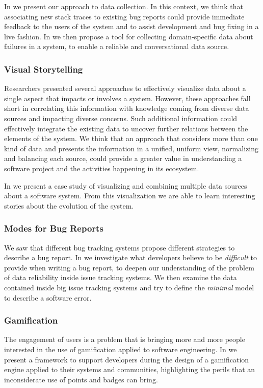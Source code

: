 In  we present our approach to data collection.
In this context, we think that associating new stack traces to existing bug reports could provide immediate feedback to the users of the system and to assist development and bug fixing in a live fashion.
In  we then propose a tool for collecting domain-specific data about failures in a system, to enable a reliable and conversational data source.


\subsubsection{Visual Storytelling}

Researchers presented several approaches to effectively visualize data about a single aspect that impacts or involves a system.
However, these approaches fall short in correlating this information with knowledge coming from diverse data sources and impacting diverse concerns.
Such additional information could effectively integrate the existing data to uncover further relations between the elements of the system.
We think that an approach that considers more than one kind of data and presents the information in a unified, uniform view, normalizing and balancing each source, could provide a greater value in understanding a software project and the activities happening in its ecosystem.

In  we present a case study of visualizing and combining multiple data sources about a software system.
From this visualization we are able to learn interesting stories about the evolution of the system.


\subsubsection{Modes for Bug Reports}

We saw that different bug tracking systems propose different strategies to describe a bug report.
In  we investigate what developers believe to be \emph{difficult} to provide when writing a bug report, to deepen our understanding of the problem of data reliability inside issue tracking systems.
We then examine the data contained inside big issue tracking systems and try to define the \emph{minimal} model to describe a software error.


\subsubsection{Gamification}

The engagement of users is a problem that is bringing more and more people interested in the use of gamification applied to software engineering.
In  we present a framework to support developers during the design of a gamification engine applied to their systems and communities, highlighting the perils that an inconsiderate use of points and badges can bring.
